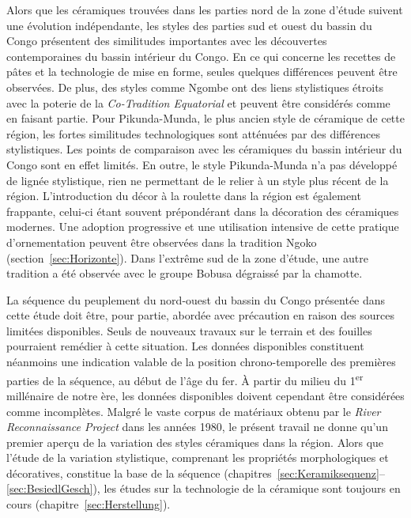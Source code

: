 \begin{multicols}{2}
Alors que les céramiques trouvées dans les parties nord de la zone d'étude suivent une évolution indépendante, les styles des parties sud et  ouest du bassin du Congo présentent des similitudes importantes avec les découvertes contemporaines du bassin intérieur du Congo. En ce qui concerne les recettes de pâtes et la technologie de mise en forme, seules quelques différences peuvent être observées. De plus, des styles comme Ngombe ont des liens stylistiques étroits avec la poterie de la \textit{Co-Tradition Equatorial} et peuvent être considérés comme en faisant partie. Pour Pikunda-Munda, le plus ancien style de céramique de cette région, les fortes similitudes technologiques sont atténuées par des différences stylistiques. Les points de comparaison avec les céramiques du bassin intérieur du Congo sont en effet limités. En outre, le style Pikunda-Munda n'a pas développé  de lignée stylistique, rien ne permettant de le relier à un style plus récent de la région. L'introduction du décor à la roulette dans la région est également frappante, celui-ci étant souvent prépondérant dans la décoration des céramiques modernes. Une adoption progressive et une utilisation intensive de cette pratique d'ornementation peuvent être observées dans la tradition Ngoko (section~\ref{sec:Horizonte}). Dans l'extrême sud de la zone d'étude, une autre tradition a été observée avec le groupe Bobusa dégraissé par la chamotte.

La séquence du peuplement du nord-ouest du bassin du Congo présentée dans cette étude doit être, pour partie, abordée avec précaution en raison des sources limitées disponibles. Seuls de nouveaux travaux sur le terrain et des fouilles pourraient remédier à cette situation. Les données disponibles constituent néanmoins une indication valable de la position chrono-temporelle des premières parties de la séquence, au début de l'âge du fer. À partir du milieu du 1\textsuperscript{er} millénaire de notre ère, les données disponibles doivent cependant être considérées comme incomplètes. Malgré le vaste corpus de matériaux obtenu par le \textit{River Reconnaissance Project} dans les années 1980, le présent travail ne donne qu'un premier aperçu de la variation des styles céramiques dans la région. Alors que l'étude de la variation stylistique, comprenant les propriétés morphologiques et décoratives, constitue la base de la séquence (chapitres~\ref{sec:Keramiksequenz}--\ref{sec:BesiedlGesch}), les études sur la technologie de la céramique sont toujours en cours (chapitre~\ref{sec:Herstellung}).


\end{multicols}